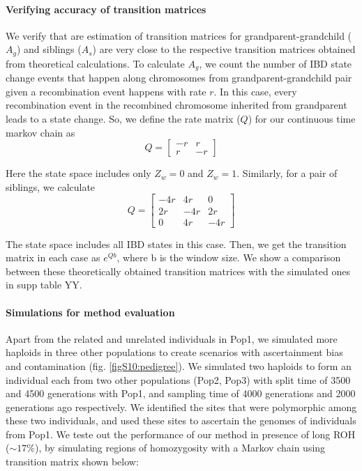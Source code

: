 \documentclass[12pt, letterpaper]{article}
\begin{document}
\paragraph{Verifying accuracy of transition matrices}\label{A_ver}
We verify that are estimation of transition matrices for grandparent-grandchild ($A_g$) and siblings ($A_s$) are very close to the respective transition matrices obtained from theoretical calculations. To calculate $A_g$, we count the number of IBD state change events that happen along chromosomes from grandparent-grandchild pair given a recombination event happens with rate $r$. In this case, every recombination event in the recombined chromosome inherited from grandparent leads to a state change. So, we define the rate matrix ($Q$) for our continuous time markov chain as $$Q = \left[\begin{array}
{rrr}
-r & r \\
r & -r 
\end{array}\right]$$   

Here the state space includes only $Z_w=0$ and $Z_w=1$. Similarly, for a pair of siblings, we calculate $$Q =  
\left[\begin{array}
{rrr}
-4r & 4r & 0\\
2r & -4r & 2r\\
0 & 4r & -4r
\end{array}\right]$$   

The state space includes all IBD states in this case. Then, we get the transition matrix in each case as $e^{Qb}$, where b is the window size. We show a comparison between these theoretically obtained transition matrices with the simulated ones in supp table YY.


\paragraph{Simulations for method evaluation}
Apart from the related and unrelated individuals in Pop1, we simulated more haploids in three other populations to create scenarios with ascertainment bias and contamination (fig. \ref{figS10:pedigree}). We simulated two haploids to form an individual each from two other populations (Pop2, Pop3) with split time of 3500 and 4500 generations with Pop1, and sampling time of 4000 generations and 2000 generations ago respectively. We identified the sites that were polymorphic among these two individuals, and used these sites to ascertain the genomes of individuals from Pop1. We teste out the performance of our method in presence of long ROH ($\sim17\%$), by simulating regions of homozygosity with a Markov chain using transition matrix shown below: 
\end{document}
